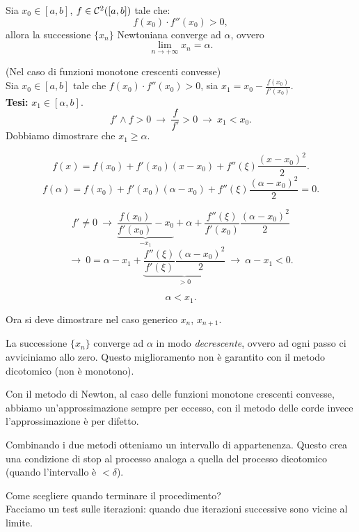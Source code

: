 \begin{prop}
Sia $x_0 \in [a,b]$, $f \in \mathcal{C}^2([a,b])$ tale che:
\[f(x_0)\cdot f''(x_0) > 0,\]
allora la successione $\{x_n\}$ Newtoniana converge ad $\alpha$, ovvero
\[\lim_{n \to +\infty}x_n = \alpha.\]
\end{prop}
\begin{dimo}(Nel caso di funzioni monotone crescenti convesse)\\

Sia $x_0 \in [a,b]$ tale che $f(x_0)\cdot f''(x_0) > 0$, sia $x_1 = x_0 -
\frac{f(x_0)}{f'(x_0)}$.\\

\textbf{Tesi:} $x_1 \in [\alpha, b]$.
\[
f' \wedge f > 0 \ \longrightarrow\ \frac{f}{f'} > 0
\ \longrightarrow\ x_1 < x_0.
\]
Dobbiamo dimostrare che $x_1 \geq \alpha$.

\[
f(x) = f(x_0) + f'(x_0)(x-x_0) + f''(\xi)\frac{(x-x_0)^2}{2}.
\]
\[
f(\alpha) = f(x_0) + f'(x_0)(\alpha-x_0) + f''(\xi)\frac{(\alpha-x_0)^2}{2}=0.
\]

\[
f' \neq 0 \ \longrightarrow \ \underbrace{\frac{f(x_0)}{f'(x_0)} - x_0}_{-x_1}
+ \alpha + \frac{f''(\xi)}{f'(x_0)}\frac{(\alpha - x_0)^2}{2}
\]
\[\longrightarrow \
0 = \alpha - x_1 + \underbrace{\frac{f''(\xi)}{f'(\xi)} 
\frac{(\alpha - x_0)^2}{2}}_{>0} \ \longrightarrow \ \alpha -x_1 <0.
\]

\[\alpha < x_1.\]
\end{dimo}
Ora si deve dimostrare nel caso generico $x_n$, $x_{n+1}$.

\begin{osse}
La successione $\{x_n\}$ converge ad $\alpha$ in modo \emph{decrescente}, 
ovvero ad ogni passo ci avviciniamo allo zero. Questo miglioramento non è 
garantito con il metodo dicotomico (non è monotono).
\end{osse}

\begin{osse}
Con il metodo di Newton, al caso delle funzioni monotone crescenti convesse,
abbiamo un'approssimazione sempre per eccesso, con il metodo delle corde 
invece l'approssimazione è per difetto.

Combinando i due metodi otteniamo un intervallo di appartenenza.
Questo crea una condizione di stop al processo analoga a quella del
processo dicotomico (quando l'intervallo è $< \delta$).
\end{osse}

Come scegliere quando terminare il procedimento?\\
Facciamo un test sulle iterazioni: quando due iterazioni successive sono 
vicine al limite.

